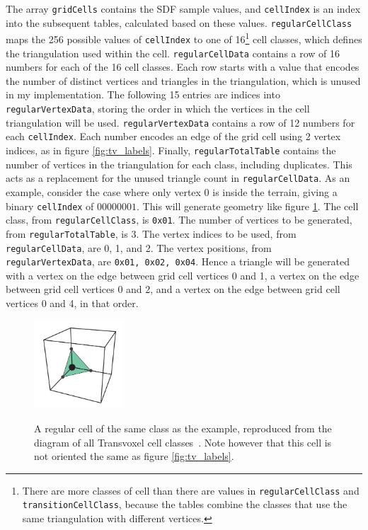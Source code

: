 \documentclass[11pt]{article}
\begin{document}
The array \texttt{gridCells} contains the SDF sample values, and \texttt{cellIndex} is an index into the subsequent tables, calculated based on these values. 
\texttt{regularCellClass} maps the 256 possible values of \texttt{cellIndex} to one of 16\footnote{There are more classes of cell than there are values in \texttt{regularCellClass} and \texttt{transitionCellClass}, because the tables combine the classes that use the same triangulation with different vertices.} cell classes, which defines the triangulation used within the cell.
\texttt{regularCellData} contains a row of 16 numbers for each of the 16 cell classes. Each row starts with a value that encodes the number of distinct vertices and triangles in the triangulation, which is unused in my implementation. The following 15 entries are indices into \texttt{regularVertexData}, storing the order in which the vertices in the cell triangulation will be used. 
\texttt{regularVertexData} contains a row of 12 numbers for each \texttt{cellIndex}. Each number encodes an edge of the grid cell using 2 vertex indices, as in figure \ref{fig:tv_labels}. 
Finally, \texttt{regularTotalTable} contains the number of vertices in the triangulation for each class, including duplicates. This acts as a replacement for the unused triangle count in \texttt{regularCellData}.
As an example, consider the case where only vertex 0 is inside the terrain, giving a binary \texttt{cellIndex} of $00000001$. This will generate geometry like figure \ref{fig:regular_cell_example_case}. The cell class, from \texttt{regularCellClass}, is \texttt{0x01}. The number of vertices to be generated, from \texttt{regularTotalTable}, is 3. The vertex indices to be used, from \texttt{regularCellData}, are 0, 1, and 2. The vertex positions, from \texttt{regularVertexData}, are \texttt{0x01, 0x02, 0x04}. Hence a triangle will be generated with a vertex on the edge between grid cell vertices 0 and 1, a vertex on the edge between grid cell vertices 0 and 2, and a vertex on the edge between grid cell vertices 0 and 4, in that order.

\begin{figure}
  \caption{A regular cell of the same class as the example, reproduced from the diagram of all Transvoxel cell classes~\cite{lengyel}. Note however that this cell is not oriented the same as figure \ref{fig:tv_labels}.}
  \includegraphics[width=0.3\textwidth]{regular_cell_example_case.PNG}
  \label{fig:regular_cell_example_case}
\end{figure}
\end{document}
